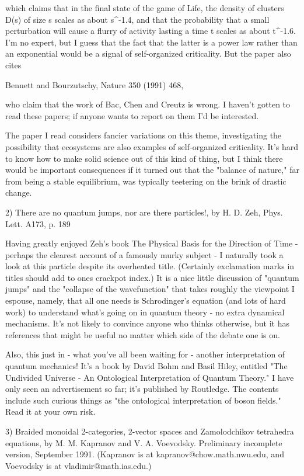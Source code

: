which claims that in the final state of the game of Life, the
density of clusters D(s) of size s scales as about s^{-1.4}, and that the
probability that a small perturbation will cause a flurry of activity
lasting a time t scales as about t^{-1.6}.   I'm no expert, but I guess
that the fact that the latter is a power law rather than an exponential
would be a signal of self-organized criticality.  But the paper also
cites

Bennett and Bourzutschy, Nature 350 (1991) 468,

who claim that the work of Bac, Chen and Creutz is wrong.  I haven't
gotten to read these papers; if anyone wants to report on them I'd be
interested.  

The paper I read considers fancier variations on this theme,
investigating the possibility that ecosystems are also examples of
self-organized criticality.  It's hard to know how to make solid science
out of this kind of thing, but I think there would be important
consequences if it turned out that the "balance of nature," far from
being a stable equilibrium, was typically teetering on the brink of
drastic change.  

2)  There are no quantum jumps, nor are there particles!, by H. D. Zeh,
Phys. Lett. A173, p. 189

Having greatly enjoyed Zeh's book The Physical Basis for the Direction
of Time - perhaps the clearest account of a famously murky subject - I
naturally took a look at this particle despite its overheated title.  
(Certainly exclamation marks in titles should add to ones crackpot index.)
It is a nice little discussion of "quantum jumps" and the "collapse of
the wavefunction" that takes roughly the viewpoint I espouse, namely,
that all one needs is Schrodinger's equation (and lots of hard work) to
understand what's going on in quantum theory - no extra dynamical
mechanisms.  It's not likely to convince anyone who thinks otherwise,
but it has references that might be useful no matter which side of the 
debate one is on.

Also, this just in - what you've all been waiting for - another
interpretation of quantum mechanics!  It's a book by David Bohm and
Basil Hiley, entitled "The Undivided Universe - An Ontological
Interpretation of Quantum Theory."  I have only seen an advertisement so
far; it's published by Routledge.  The contents include such curious
things as "the ontological interpretation of boson fields."  Read it at
your own risk.

3) Braided monoidal 2-categories, 2-vector spaces and Zamolodchikov
tetrahedra equations, by M. M. Kapranov and V. A. Voevodsky.
Preliminary incomplete version, September 1991.  (Kapranov is at
kapranov@chow.math.nwu.edu, and Voevodsky is at vladimir@math.ias.edu.)

